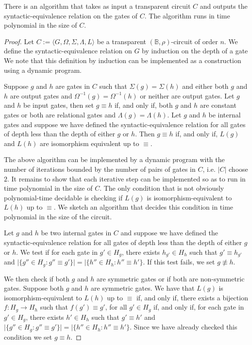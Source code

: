 \documentclass[../paper.tex]{subfiles}
\begin{document}
\begin{lem}
  There is an algorithm that takes as input a transparent circuit $C$ and
  outputs the syntactic-equivalence relation on the gates of $C$. The algorithm
  runs in time polynomial in the size of $C$.
  \label{lem:transparent-syntactic-equiv}
\end{lem}
\begin{proof}
  Let $C := \langle G, \Omega, \Sigma, \Lambda, L \rangle$ be a transparent
  $(\mathbb{B}, \rho)$-circuit of order $n$. We define the syntactic-equivalence
  relation on $G$ by induction on the depth of a gate We note that this
  definition by induction can be implemented as a construction using a dynamic
  program.
  
  Suppose $g$ and $h$ are gates in $C$ such that $\Sigma (g) = \Sigma(h)$ and
  either both $g$ and $h$ are output gates and $\Omega^{-1}(g) = \Omega^{-1}(h)$
  or neither are output gates. Let $g$ and $h$ be input gates, then set $g
  \equiv h$ if, and only if, both $g$ and $h$ are constant gates or both are
  relational gates and $\Lambda(g) = \Lambda (h)$. Let $g$ and $h$ be internal
  gates and suppose we have defined the syntactic-equivalence relation for all
  gates of depth less than the depth of either $g$ or $h$. Then $g \equiv h$ if,
  and only if, $L(g)$ and $L(h)$ are isomorphism equivalent up to $\equiv$.

  The above algorithm can be implemented by a dynamic program with the number of
  iterations bounded by the number of pairs of gates in $C$, i.e. $\vert C
  \vert$ choose $2$. It remains to show that each iterative step can be
  implemented so as to run in time polynomial in the size of $C$. The only
  condition that is not obviously polynomial-time decidable is checking if
  $L(g)$ is isomorphism-equivalent to $L(h)$ up to $\equiv$. We sketch an
  algorithm that decides this condition in time polynomial in the size of the
  circuit.
  
  Let $g$ and $h$ be two internal gates in $C$ and suppose we have defined the
  syntactic-equivalence relation for all gates of depth less than the depth of
  either $g$ or $h$. We test if for each gate in $g' \in H_g$, there exists
  $h_{g'} \in H_h$ such that $g' \equiv h_{g'}$ and $\vert \{g'' \in H_g : g''
  \equiv g'\} \vert = \vert \{h'' \in H_h : h'' \equiv h'\}$. If this test
  fails, we set $g \not\equiv h$.

  We then check if both $g$ and $h$ are symmetric gates or if both are
  non-symmetric gates. Suppose both $g$ and $h$ are symmetric gates. We have
  that $L(g)$ is isomorphism-equivalent to $L(h)$ up to $\equiv$ if, and only
  if, there exists a bijection $f : H_g \rightarrow H_h$ such that $f(g') \equiv
  g'$, for all $g' \in H_g$ if, and only if, for each gate in $g' \in H_g$,
  there exists $h' \in H_h$ such that $g' \equiv h'$ and $\vert \{g'' \in H_g :
  g'' \equiv g'\} \vert = \vert \{h'' \in H_h : h'' \equiv h'\}$. Since we have
  already checked this condition we set $g \equiv h$.


\end{proof}
\end{document}
